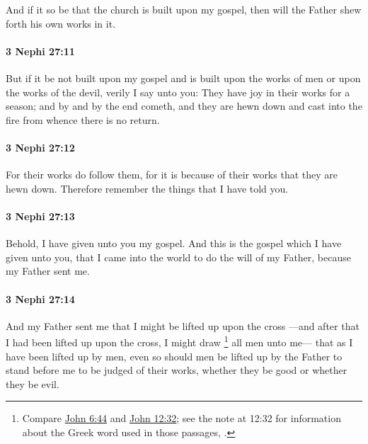 			And if it so be that the church is built upon my gospel,
			then will the Father shew forth his own works in it.

		\paragraph{3 Nephi 27:11} %
			\label{3NEPHI-27-11}

			But if it be not built upon my gospel
			and is built upon the works of men or upon the works of the devil,
			verily I say unto you:
			They have joy in their works for a season;
			and by and by the end cometh,
			and they are hewn down and cast into the fire
			from whence there is no return.

		\paragraph{3 Nephi 27:12} %
			\label{3NEPHI-27-12}

			For their works do follow them,
			for it is because of their works that they are hewn down.
			Therefore remember the things that I have told you.

		\paragraph{3 Nephi 27:13} %
			\label{3NEPHI-27-13}

			Behold, I have given unto you my gospel.
			And this is the gospel which I have given unto you,
			that I came into the world to do the will of my Father,
			because my Father sent me.

		\paragraph{3 Nephi 27:14}
			\label{3NEPHI-27-14}

			And my Father sent me that I might be lifted up upon the cross
			---and after that I had been lifted up upon the cross,
			I might draw%
				\footnote{%
					Compare \hyperref[JOHN-6-44]{John 6:44} and \hyperref[JOHN-12-32]{John 12:32}; see the note at 12:32 for information about the Greek word used in those passages, .
					} 
			all men unto me---
			that as I have been lifted up by men,
			even so should men be lifted up by the Father
			to stand before me to be judged of their works,
			whether they be good or whether they be evil.

